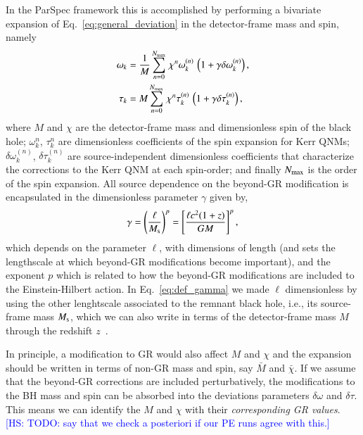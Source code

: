 \documentclass[twocolumn,
               prd,
               aps,
               superscriptaddress,
               tightenlines,
               nofootinbib,
               eqsecnum,
               amsfonts,
               amsmath,
               longbibliography]{revtex4-1}
\newcommand{\hs}[1]{{\textcolor{blue}{{[HS: #1]}} }}
\begin{document}
In the ParSpec framework this is accomplished by performing a bivariate
expansion of Eq.~\eqref{eq:general_deviation} in the detector-frame mass and
spin, namely
%
\begin{subequations}
\label{eq:kerr_expansion}
\begin{align}
\omega_{k} &= \frac{1}{M} \sum_{n = 0}^{N_{\rm max}} \, \chi^{n} \omega^{(n)}_{k} \, \left( 1 + \gamma \delta \omega^{(n)}_{k} \right), \\
\tau_{k}   &= M     \sum_{n = 0}^{N_{\rm max}} \, \chi^{n} \tau^{(n)}_{k}   \, \left( 1 + \gamma \delta \tau^{(n)}_{k} \right),
\end{align}
\end{subequations}
%
where $M$ and $\chi$ are the detector-frame mass and dimensionless spin of the
black hole; $\omega_{k}^{n}$, $\tau_{k}^{n}$ are dimensionless coefficients
of the spin expansion for Kerr QNMs; $\delta\omega_{k}^{(n)}$, $\delta\tau_{k}^{(n)}$ are
source-independent dimensionless coefficients that characterize the corrections to the Kerr QNM at each spin-order;
and finally $N_{\rm max}$ is the order of the spin expansion.
%
All source dependence on the beyond-GR modification is encapsulated in the dimensionless
parameter $\gamma$ given by,
%
\begin{equation}
\gamma
%
= \left(\frac{\ell}{M_{\rm s}}\right)^{p}
%
= \left[
\frac{\ell c^2 (1 + z)}{G M}
\right]^{p},
\label{eq:def_gamma}
\end{equation}
%
which depends on the parameter $\ell$, with dimensions of length (and sets the
lengthscale at which beyond-GR modifications become important), and
the exponent $p$ which is related to how the beyond-GR modifications are
included to the Einstein-Hilbert action.
%
In Eq.~\eqref{eq:def_gamma} we made $\ell$ dimensionless by using the other
lenghtscale associated to the remnant black hole, i.e., its source-frame mass
$M_{\rm s}$, which we can also write in terms of the detector-frame mass $M$ through
the redshift $z$~\cite{Krolak:1987ofj}.

In principle, a modification to GR would also affect $M$ and $\chi$ and the expansion should be written
in terms of non-GR mass and spin, say $\bar{M}$ and $\bar{\chi}$. If we assume that the beyond-GR corrections
are included perturbatively, the modifications to the BH mass and spin can be absorbed into the deviations
parameters $\delta\omega$ and $\delta\tau$.
%
This means we can identify the $M$ and $\chi$ with their \emph{corresponding GR values}.
%
\hs{TODO: say that we check a posteriori if our PE runs agree with this.}
\end{document}
